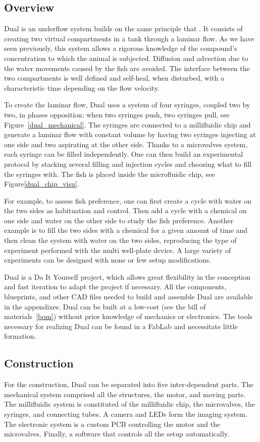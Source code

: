   \subsection{Overview}
  Dual is an underflow system builds on the same principle that \cite{readman2013fish}. It consists of creating two virtual compartments in a tank through a laminar flow. As we have seen previously, this system allows a rigorous knowledge of the compound's concentration to which the animal is subjected. Diffusion and advection due to the water movements caused by the fish are avoided. The interface between the two compartments is well defined and self-heal, when disturbed, with a characteristic time depending on the flow velocity.

  To create the laminar flow, Dual uses a system of four syringes, coupled two by two, in phases opposition: when two syringes push, two syringes pull, see Figure~\ref{dual_mechanical}. The syringes are connected to a millifluidic chip and generate a laminar flow with constant volume by having two syringes injecting at one side and two aspirating at the other side. Thanks to a microvalves system, each syringe can be filled independently. One can then build an experimental protocol by stacking several filling and injection cycles and choosing what to fill the syringes with. The fish is placed inside the microfluidic chip, see Figure\ref{dual_chip_visu}.

  For example, to assess fish preference, one can first create a cycle with water on the two sides as habituation and control. Then add a cycle with a chemical on one side and water on the other side to study the fish preference. Another example is to fill the two sides with a chemical for a given amount of time and then clean the system with water on the two sides, reproducing the type of experiment performed with the multi well-plate device. A large variety of experiments can be designed with none or few setup modifications.

  Dual is a Do It Yourself project, which allows great flexibility in the conception and fast iteration to adapt the project if necessary. All the components, blueprints, and other CAD files needed to build and assemble Dual are available in the appendixes. Dual can be built at a low-cost (see the bill of materials~\ref{bom}) without prior knowledge of mechanics or electronics. The tools necessary for realizing Dual can be found in a FabLab and necessitate little formation.

  \subsection{Construction}
  For the construction, Dual can be separated into five inter-dependent parts. The mechanical system comprised all the structures, the motor, and moving parts. The millifluidic system is constituted of the millifluidic chip, the microvalves, the syringes, and connecting tubes.  A camera and LEDs form the imaging system. The electronic system is a custom PCB controlling the motor and the microvalves. Finally, a software that controls all the setup automatically.

